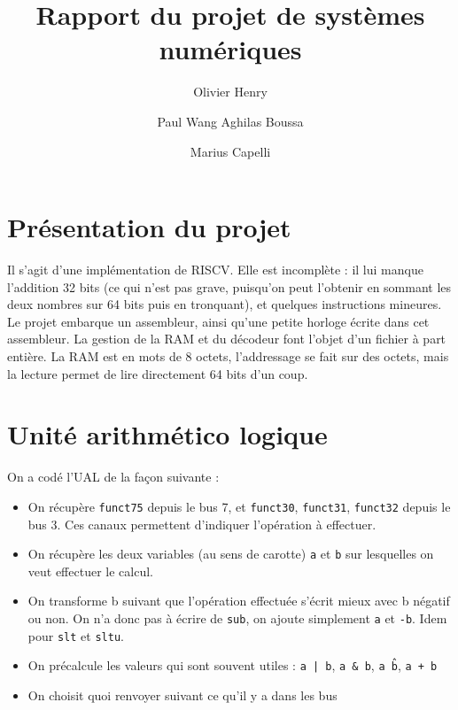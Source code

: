 \documentclass{article}
\author{
  Olivier Henry
  \and
  Paul Wang  
  Aghilas Boussa
  \and
  Marius Capelli
}
\date{}
\title{ Rapport du projet de systèmes numériques}
\begin{document}
\maketitle

\newpage

\section{Présentation du projet}

Il s'agit d'une implémentation de RISCV. Elle est incomplète : il lui manque l'addition 32 bits (ce qui n'est pas grave, puisqu'on peut l'obtenir en sommant les deux nombres sur 64 bits puis en tronquant), et quelques instructions mineures. Le projet embarque un assembleur, ainsi qu'une petite horloge écrite dans cet assembleur. La gestion de la RAM et du décodeur font l'objet d'un fichier à part entière. La RAM est en mots de 8 octets, l'addressage se fait sur des octets, mais la lecture permet de lire directement 64 bits d'un coup. 

\section{Unité arithmético logique}

On a codé l'UAL de la façon suivante : 
\begin{itemize}
    \item On récupère \texttt{funct75} depuis le bus 7, et \texttt{funct30}, \texttt{funct31}, \texttt{funct32} depuis le bus 3. Ces canaux permettent d'indiquer l'opération à effectuer. 
    \item On récupère les deux variables (au sens de carotte) \texttt{a} et \texttt{b} sur lesquelles on veut effectuer le calcul. 
    \item On transforme b suivant que l'opération effectuée s'écrit mieux avec b négatif ou non. On n'a donc pas à écrire de \texttt{sub}, on ajoute simplement \texttt{a} et \texttt{-b}. Idem pour \texttt{slt} et \texttt{sltu}.
    \item On précalcule les valeurs qui sont souvent utiles : \texttt{a | b}, \texttt{a \& b}, \texttt{a \^ b}, \texttt{a + b}
    \item On choisit quoi renvoyer suivant ce qu'il y a dans les bus 
\end{itemize}
\end{document}
